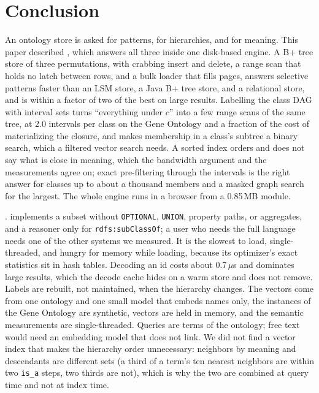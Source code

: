 \section{Conclusion}
\label{sec-conclude}

An ontology store is asked for patterns, for hierarchies, and for meaning.
This paper described \sys, which answers all three inside one disk-based
engine.
A B+ tree store of three permutations, with crabbing insert and delete, a range
scan that holds no latch between rows, and a bulk loader that fills pages,
answers selective patterns faster than an LSM store, a Java B+ tree store, and a
relational store, and is within a factor of two of the best on large results.
Labelling the class DAG with interval sets turns ``everything under $c$'' into
a few range scans of the same tree, at 2.0 intervals per class on the Gene
Ontology and a fraction of the cost of materializing the closure, and makes
membership in a class's subtree a binary search, which a filtered vector search
needs.
A sorted index orders and does not say what is close in meaning, which the
bandwidth argument and the measurements agree on; exact pre-filtering through
the intervals is the right answer for classes up to about a thousand members
and a masked graph search for the largest.
The whole engine runs in a browser from a 0.85\,MB module.

.
\sys implements a \sparql subset without \texttt{OPTIONAL}, \texttt{UNION},
property paths, or aggregates, and a reasoner only for
\texttt{rdfs:subClassOf}; a user who needs the full language needs one of the
other systems we measured.
It is the slowest to load, single-threaded, and hungry for memory while
loading, because its optimizer's exact statistics sit in hash tables.
Decoding an id costs about 0.7\,$\mu$s and dominates large results, which the
decode cache hides on a warm store and does not remove.
Labels are rebuilt, not maintained, when the hierarchy changes.
The vectors come from one ontology and one small model that embeds names only,
the instances of the Gene Ontology are synthetic, vectors are held in memory,
and the semantic measurements are single-threaded.
Queries are terms of the ontology; free text would need an embedding model that
\sys does not link.
We did not find a vector index that makes the hierarchy order unnecessary:
neighbors by meaning and descendants are different sets (a third of a term's
ten nearest neighbors are within two \texttt{is\_a} steps, two thirds are
not), which is why the two are combined at query time and not at index time.
